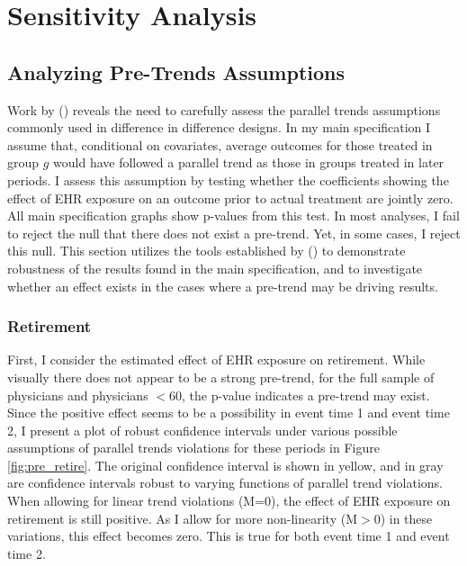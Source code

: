 \documentclass[12pt]{article}
\begin{document}
\section{Sensitivity Analysis}

\subsection{Analyzing Pre-Trends Assumptions}\label{sec:pretrends}

Work by \citeauthor{rambachan2019honest} (\citeyear{rambachan2019honest}) reveals the need to carefully assess the parallel trends assumptions commonly used in difference in difference designs. In my main specification I assume that, conditional on covariates, average outcomes for those treated in group $g$ would have followed a parallel trend as those in groups treated in later periods. I assess this assumption by testing whether the coefficients showing the effect of EHR exposure on an outcome prior to actual treatment are jointly zero. All main specification graphs show p-values from this test. In most analyses, I fail to reject the null that there does not exist a pre-trend. Yet, in some cases, I reject this null. This section utilizes the tools established by \citeauthor{rambachan2019honest} (\citeyear{rambachan2019honest}) to demonstrate robustness of the results found in the main specification, and to investigate whether an effect exists in the cases where a pre-trend may be driving results. 

\subsubsection{Retirement} 

First, I consider the estimated effect of EHR exposure on retirement. While visually there does not appear to be a strong pre-trend, for the full sample of physicians and physicians $< 60$, the p-value indicates a pre-trend may exist. Since the positive effect seems to be a possibility in event time 1 and event time 2, I present a plot of robust confidence intervals under various possible assumptions of parallel trends violations for these periods in Figure \ref{fig:pre_retire}. The original confidence interval is shown in yellow, and in gray are confidence intervals robust to varying functions of parallel trend violations. When allowing for linear trend violations (M=0), the effect of EHR exposure on retirement is still positive. As I allow for more non-linearity (M$>$0) in these variations, this effect becomes zero. This is true for both event time 1 and event time 2. 
\end{document}
